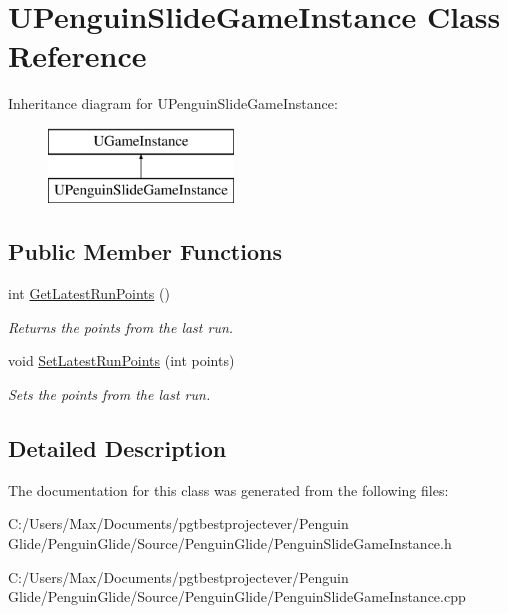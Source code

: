 \hypertarget{class_u_penguin_slide_game_instance}{}\section{U\+Penguin\+Slide\+Game\+Instance Class Reference}
\label{class_u_penguin_slide_game_instance}
Inheritance diagram for U\+Penguin\+Slide\+Game\+Instance\+:\begin{figure}[H]
\begin{center}
\leavevmode
\includegraphics[height=2.000000cm]{class_u_penguin_slide_game_instance}
\end{center}
\end{figure}
\subsection*{Public Member Functions}
\begin{DoxyCompactItemize}
\item 
\mbox{\label{class_u_penguin_slide_game_instance_ac29e6f5c900b621d3daebb24b8677a7a}} 
int \mbox{\hyperlink{class_u_penguin_slide_game_instance_ac29e6f5c900b621d3daebb24b8677a7a}{Get\+Latest\+Run\+Points}} ()
\begin{DoxyCompactList}\small\item\em Returns the points from the last run. \end{DoxyCompactList}\item 
\mbox{\label{class_u_penguin_slide_game_instance_a8c188d460c49a1f392a97b5c3d08ce1e}} 
void \mbox{\hyperlink{class_u_penguin_slide_game_instance_a8c188d460c49a1f392a97b5c3d08ce1e}{Set\+Latest\+Run\+Points}} (int points)
\begin{DoxyCompactList}\small\item\em Sets the points from the last run. \end{DoxyCompactList}\end{DoxyCompactItemize}


\subsection{Detailed Description}


The documentation for this class was generated from the following files\+:\begin{DoxyCompactItemize}
\item 
C\+:/\+Users/\+Max/\+Documents/pgtbestprojectever/\+Penguin Glide/\+Penguin\+Glide/\+Source/\+Penguin\+Glide/Penguin\+Slide\+Game\+Instance.\+h\item 
C\+:/\+Users/\+Max/\+Documents/pgtbestprojectever/\+Penguin Glide/\+Penguin\+Glide/\+Source/\+Penguin\+Glide/Penguin\+Slide\+Game\+Instance.\+cpp\end{DoxyCompactItemize}
